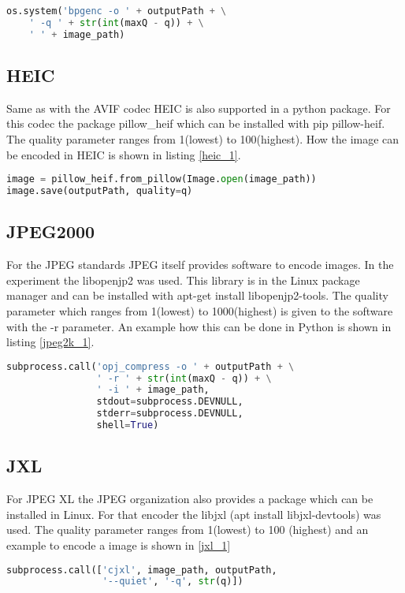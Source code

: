 \begin{lstlisting}[label={bpg_1}, language=Python, caption=Encode BPG]
os.system('bpgenc -o ' + outputPath + \
    ' -q ' + str(int(maxQ - q)) + \
    ' ' + image_path)
\end{lstlisting}

\subsection{HEIC}
Same as with the AVIF codec HEIC is also supported in a python package. For this codec the package pillow\_heif which can be installed with pip pillow-heif. The quality parameter ranges from 1(lowest) to 100(highest).
How the image can be encoded in HEIC is shown in listing \ref{heic_1}.

\begin{lstlisting}[label={heic_1}, language=Python, caption=Encode HEIC]
image = pillow_heif.from_pillow(Image.open(image_path))
image.save(outputPath, quality=q)
\end{lstlisting}

\subsection{JPEG2000}
For the JPEG standards JPEG itself provides software to encode images. In the experiment the libopenjp2 was used. This library is in the Linux package manager and can be installed with apt-get install libopenjp2-tools. The quality parameter which ranges from 1(lowest) to 1000(highest) is given to the software with the -r parameter. An example how this can be done in Python is shown in listing \ref{jpeg2k_1}.
\begin{lstlisting}[label={jpeg2k_1}, language=Python, caption=Encode JPEG 2000]
subprocess.call('opj_compress -o ' + outputPath + \
                ' -r ' + str(int(maxQ - q)) + \
                ' -i ' + image_path,
                stdout=subprocess.DEVNULL,
                stderr=subprocess.DEVNULL,
                shell=True)
\end{lstlisting}

\subsection{JXL}
For JPEG XL the JPEG organization also provides a package which can be installed in Linux. For that encoder the libjxl (apt install libjxl-devtools) was used. The quality parameter ranges from 1(lowest) to 100 (highest) and an example to encode a image is shown in \ref{jxl_1}
\begin{lstlisting}[label={jxl_1}, language=Python, caption=Encode JPEG XL]
subprocess.call(['cjxl', image_path, outputPath,
                 '--quiet', '-q', str(q)])
\end{lstlisting}
